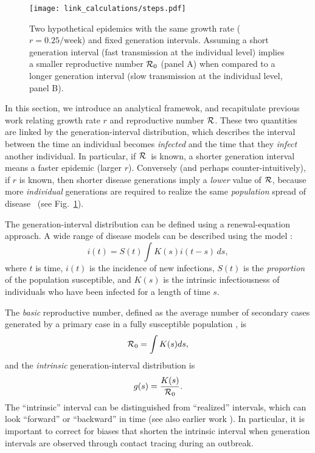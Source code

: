 \documentclass[12pt]{article}
\newcommand{\RR}{\ensuremath{{\cal R}}}
\newcommand{\Rx}[1]{\ensuremath{{\cal R}_{#1}}}
\newcommand{\Ro}{\Rx{0}}
\newcommand{\fref}[1]{Fig.~\ref{fig:#1}}
\begin{document}
\begin{figure}[htbp] \centering
	\texttt{[image: link\_calculations/steps.pdf]}
	\caption{Two hypothetical epidemics with the same growth rate ($r=0.25/\mathrm{week}$) and fixed generation intervals.  Assuming a short generation interval (fast transmission at the individual level) implies a smaller reproductive number $\Ro$ (panel A) when compared to a longer generation interval (slow transmission at the individual level, panel B). 
	\label{fig:link}}
\end{figure}

In this section, we introduce an analytical framewok, and recapitulate previous work relating growth rate $r$ and reproductive number \RR.
These two quantities are linked by the generation-interval distribution, which describes the interval between the time an individual becomes \emph{infected} and the time that they \emph{infect} another individual.
In particular, if \RR~is known, a shorter generation interval means a faster epidemic (larger $r$). Conversely (and perhaps counter-intuitively), if $r$ is known, then shorter disease generations imply a \emph{lower} value of \RR, because more \emph{individual} generations are required to realize the same \emph{population} spread of disease \cite{EatoHall14,PoweKret14}~(see \fref{link}).

The generation-interval distribution can be defined using a renewal-equation approach.
A wide range of disease models can be described using the model 
\cite{heesterbeek1996concept,diekmann2000mathematical,roberts2004modelling,aldis2005integral,WallLips07,roberts2007model}:
\begin{equation}
i(t) = S(t)\int{K(s)i(t-s) \,ds},
\label{eq:Renewal}
\end{equation}
where $t$ is time, $i(t)$ is the incidence of new infections, $S(t)$ is the \emph{proportion} of the population susceptible, and $K(s)$ is the intrinsic infectiousness of individuals who have been infected for a length of time $s$.

The \emph{basic} reproductive number, defined as the average number of secondary cases generated by a primary case in a fully susceptible population \cite{AndeMay91, DiekHees90}, is
\begin{equation}
\Ro = \int{K(s)ds},
\end{equation}
and the \emph{intrinsic} generation-interval distribution is
\begin{equation}
g(s) = \frac{K(s)}{\Ro}.
\end{equation}
The ``intrinsic'' interval can be distinguished from ``realized'' intervals, which can look ``forward'' or ``backward'' in time \cite{ChamDush15} (see also earlier work \cite{Sven07,Nish10}). 
In particular, it is important to correct for biases that shorten the intrinsic interval when generation intervals are observed through contact tracing during an outbreak.
\end{document}
